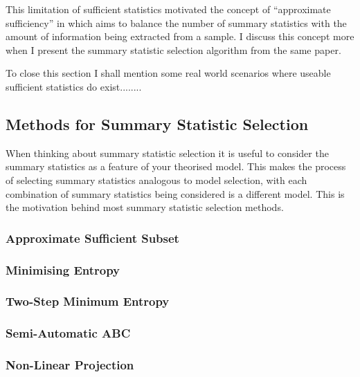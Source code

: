 \documentclass[11pt,a4paper,margin=0]{article}
\theoremstyle{break}
\begin{document}
  \par This limitation of sufficient statistics motivated the concept of ``approximate sufficiency'' in \cite{Approximately_sufficient_statistics_and_bayesian_computation} which aims to balance the number of summary statistics with the amount of information being extracted from a sample. I discuss this concept more when I present the summary statistic selection algorithm from the same paper.

  To close this section I shall mention some real world scenarios where useable sufficient statistics do exist........


\subsection{Methods for Summary Statistic Selection}\label{sec_summary_stats_methods}

  \par When thinking about summary statistic selection it is useful to consider the summary statistics as a feature of your theorised model. This makes the process of selecting summary statistics analogous to model selection, with each combination of summary statistics being considered is a different model. This is the motivation behind most summary statistic selection methods.

\subsubsection*{Approximate Sufficient Subset \cite[]{Approximately_sufficient_statistics_and_bayesian_computation}}
\subsubsection*{Minimising Entropy \cite[]{on_optimal_selection_of_summary_stats_for_ABC}}
\subsubsection*{Two-Step Minimum Entropy \cite[]{on_optimal_selection_of_summary_stats_for_ABC}}
\subsubsection*{Semi-Automatic ABC \cite[]{constructing_summary_statistics_for_approximate_bayesian_computation_semi_automatic_ABC}}
\subsubsection*{Non-Linear Projection}
\end{document}
